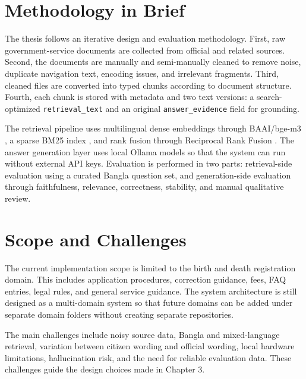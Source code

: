 \section{Methodology in Brief}
The thesis follows an iterative design and evaluation methodology. First, raw government-service documents are collected from official and related sources. Second, the documents are manually and semi-manually cleaned to remove noise, duplicate navigation text, encoding issues, and irrelevant fragments. Third, cleaned files are converted into typed chunks according to document structure. Fourth, each chunk is stored with metadata and two text versions: a search-optimized \texttt{retrieval\_text} and an original \texttt{answer\_evidence} field for grounding.

The retrieval pipeline uses multilingual dense embeddings through BAAI/bge-m3 \cite{chen2024bgem3}, a sparse BM25 index \cite{robertson2009bm25}, and rank fusion through Reciprocal Rank Fusion \cite{cormack2009rrf}. The answer generation layer uses local Ollama models so that the system can run without external API keys. Evaluation is performed in two parts: retrieval-side evaluation using a curated Bangla question set, and generation-side evaluation through faithfulness, relevance, correctness, stability, and manual qualitative review.

\section{Scope and Challenges}
The current implementation scope is limited to the birth and death registration domain. This includes application procedures, correction guidance, fees, FAQ entries, legal rules, and general service guidance. The system architecture is still designed as a multi-domain system so that future domains can be added under separate domain folders without creating separate repositories.

The main challenges include noisy source data, Bangla and mixed-language retrieval, variation between citizen wording and official wording, local hardware limitations, hallucination risk, and the need for reliable evaluation data. These challenges guide the design choices made in Chapter 3.
